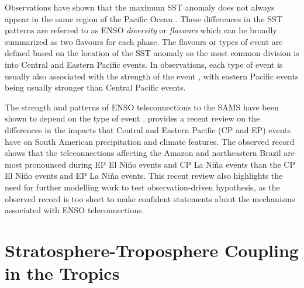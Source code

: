 Observations have shown that the maximum SST anomaly does not always appear in the same region of the Pacific Ocean \citep{ashok2009,dommenget2013}. These differences in the SST patterns are referred to as ENSO \textit{ diversity} or \textit{flavours} which can be broadly summarized as two flavours for each phase. The flavours or types of event are defined based on the location of the SST anomaly so the most common division is into Central and Eastern Pacific events.  In observations, each type of event is usually also associated with the strength of the event \citep{dommenget2013}, with eastern Pacific events being usually stronger than Central Pacific events. 

The strength and patterns of ENSO teleconnections to the SAMS have been shown to depend on the type of event  \citep{rodrigues2011,sulca2018}. 
\cite{cai2020} provides a recent review on the differences in the impacts that Central and Eastern Pacific (CP and EP) events have on South American precipitation and climate features.
The observed record shows that the teleconnections affecting the Amazon and northeastern Brazil are most pronounced during EP El Niño events and CP La Niña events than the CP El Niño events and EP La Niña events. 
 This recent review also highlights the need for further modelling work to test observation-driven hypothesis, as the observed record is too short to make confident statements about the mechanisms associated with ENSO teleconnections.



 
 
 





\section{Stratosphere-Troposphere Coupling in the Tropics}\label{sq:qbolit}

